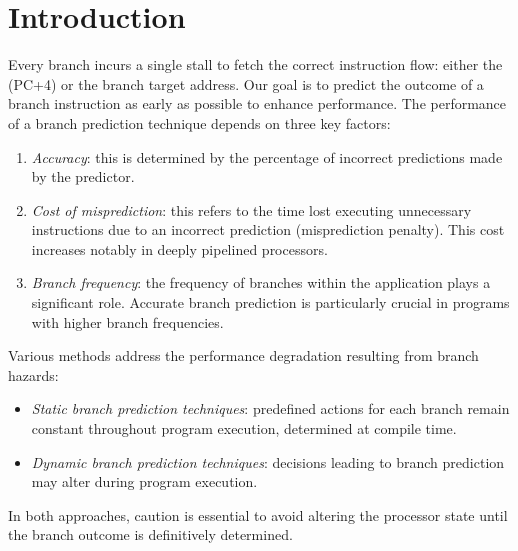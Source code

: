 \section{Introduction}

Every branch incurs a single stall to fetch the correct instruction flow: either the (PC+4) or the branch target address. 
Our goal is to predict the outcome of a branch instruction as early as possible to enhance performance. 
The performance of a branch prediction technique depends on three key factors:
\begin{enumerate}
    \item \textit{Accuracy}: this is determined by the percentage of incorrect predictions made by the predictor.
    \item \textit{Cost of misprediction}: this refers to the time lost executing unnecessary instructions due to an incorrect prediction (misprediction penalty). 
        This cost increases notably in deeply pipelined processors.
    \item \textit{Branch frequency}: the frequency of branches within the application plays a significant role. 
        Accurate branch prediction is particularly crucial in programs with higher branch frequencies.
\end{enumerate}
Various methods address the performance degradation resulting from branch hazards:
\begin{itemize}
    \item \textit{Static branch prediction techniques}: predefined actions for each branch remain constant throughout program execution, determined at compile time.
    \item \textit{Dynamic branch prediction techniques}: decisions leading to branch prediction may alter during program execution.
\end{itemize}
In both approaches, caution is essential to avoid altering the processor state until the branch outcome is definitively determined.